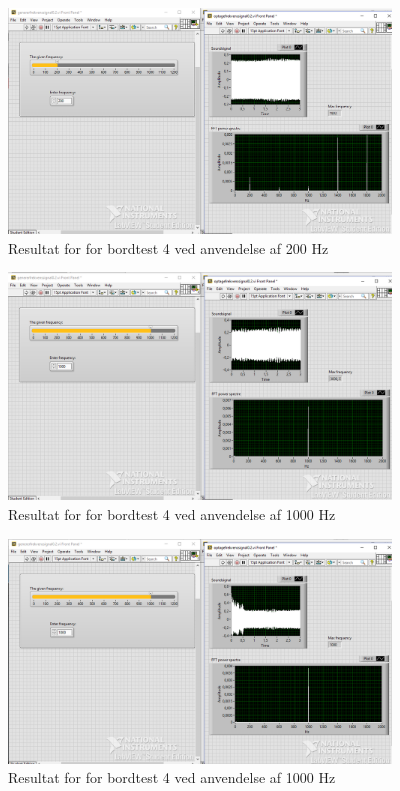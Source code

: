 			\begin{figure}[htb]
			\centering
				\includegraphics[width=4in]{Bordtest4200Hz}
				\caption{Resultat for for bordtest 4 ved anvendelse af 200 Hz}	
				\label{fig:bt4200}
			\end{figure} 
			
			\begin{figure}[htb]
			\centering
				\includegraphics[width=4in]{Bordtest41000Hz}
				\caption{Resultat for for bordtest 4 ved anvendelse af 1000 Hz}	
				\label{fig:bt41000}
			\end{figure} 
			
			\begin{figure}[htb]
			\centering
				\includegraphics[width=4in]{Bordtest41000Hzb}
				\caption{Resultat for for bordtest 4 ved anvendelse af 1000 Hz}	
				\label{fig:bt41000b}
			\end{figure} 
			
